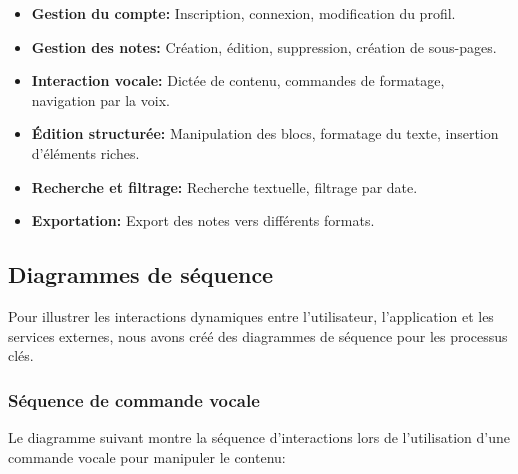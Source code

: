     \begin{itemize}
        \item \textbf{Gestion du compte:} Inscription, connexion, modification du profil.
        
        \item \textbf{Gestion des notes:} Création, édition, suppression, création de sous-pages.
        
        \item \textbf{Interaction vocale:} Dictée de contenu, commandes de formatage, navigation par la voix.
        
        \item \textbf{Édition structurée:} Manipulation des blocs, formatage du texte, insertion d'éléments riches.
        
        \item \textbf{Recherche et filtrage:} Recherche textuelle, filtrage par date.
        
        \item \textbf{Exportation:} Export des notes vers différents formats.
    \end{itemize}
    
    \subsection{Diagrammes de séquence}
    
    Pour illustrer les interactions dynamiques entre l'utilisateur, l'application et les services externes, nous avons créé des diagrammes de séquence pour les processus clés.
    
    \subsubsection{Séquence de commande vocale}
    
    Le diagramme suivant montre la séquence d'interactions lors de l'utilisation d'une commande vocale pour manipuler le contenu:
    
